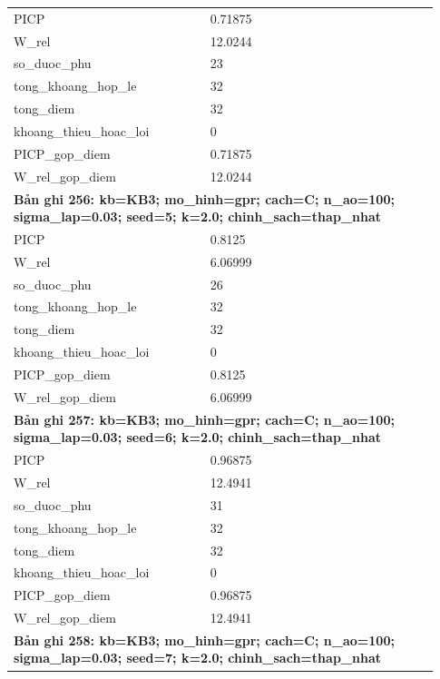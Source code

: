 \begin{longtable}{p{0.43\linewidth}p{0.50\linewidth}}
PICP & 0.71875 \\
W\_\allowbreak rel & 12.0244 \\
so\_\allowbreak duoc\_\allowbreak phu & 23 \\
tong\_\allowbreak khoang\_\allowbreak hop\_\allowbreak le & 32 \\
tong\_\allowbreak diem & 32 \\
khoang\_\allowbreak thieu\_\allowbreak hoac\_\allowbreak loi & 0 \\
PICP\_\allowbreak gop\_\allowbreak diem & 0.71875 \\
W\_\allowbreak rel\_\allowbreak gop\_\allowbreak diem & 12.0244 \\
\midrule
\multicolumn{2}{p{0.95\linewidth}}{\textbf{Bản ghi 256: kb=KB3; mo\_hinh=gpr; cach=C; n\_ao=100; sigma\_lap=0.03; seed=5; k=2.0; chinh\_sach=thap\_nhat}} \\
PICP & 0.8125 \\
W\_\allowbreak rel & 6.06999 \\
so\_\allowbreak duoc\_\allowbreak phu & 26 \\
tong\_\allowbreak khoang\_\allowbreak hop\_\allowbreak le & 32 \\
tong\_\allowbreak diem & 32 \\
khoang\_\allowbreak thieu\_\allowbreak hoac\_\allowbreak loi & 0 \\
PICP\_\allowbreak gop\_\allowbreak diem & 0.8125 \\
W\_\allowbreak rel\_\allowbreak gop\_\allowbreak diem & 6.06999 \\
\midrule
\multicolumn{2}{p{0.95\linewidth}}{\textbf{Bản ghi 257: kb=KB3; mo\_hinh=gpr; cach=C; n\_ao=100; sigma\_lap=0.03; seed=6; k=2.0; chinh\_sach=thap\_nhat}} \\
PICP & 0.96875 \\
W\_\allowbreak rel & 12.4941 \\
so\_\allowbreak duoc\_\allowbreak phu & 31 \\
tong\_\allowbreak khoang\_\allowbreak hop\_\allowbreak le & 32 \\
tong\_\allowbreak diem & 32 \\
khoang\_\allowbreak thieu\_\allowbreak hoac\_\allowbreak loi & 0 \\
PICP\_\allowbreak gop\_\allowbreak diem & 0.96875 \\
W\_\allowbreak rel\_\allowbreak gop\_\allowbreak diem & 12.4941 \\
\midrule
\multicolumn{2}{p{0.95\linewidth}}{\textbf{Bản ghi 258: kb=KB3; mo\_hinh=gpr; cach=C; n\_ao=100; sigma\_lap=0.03; seed=7; k=2.0; chinh\_sach=thap\_nhat}} \\

\end{longtable}
